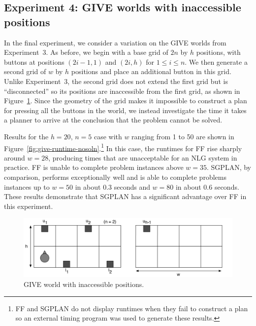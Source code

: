 \subsection{Experiment 4: GIVE worlds with inaccessible positions}
\label{sec:experiment-4:-give}

In the final experiment, we consider a variation on the GIVE worlds from
Experiment~3. As before, we begin with a base grid of $2n$ by $h$
positions, with buttons at positions $(2i-1,1)$ and $(2i,h)$ for $1 \leq i
\leq n$. We then generate a second grid of $w$ by $h$ positions and place
an additional button in this grid. Unlike Experiment~3, the second grid
does not extend the first grid but is ``disconnected'' so its positions are
inaccessible from the first grid, as shown in
Figure~\ref{fig:give-junk-nosoln}. Since the geometry of the grid makes it
impossible to construct a plan for pressing all the buttons in the world,
we instead investigate the time it takes a planner to arrive at the
conclusion that the problem cannot be solved.

Results for the $h=20$, $n=5$ case with $w$ ranging from 1 to 50 are shown
in Figure~\ref{fig:give-runtime-nosoln}.\footnote{FF and SGPLAN do
 not display runtimes when they fail to construct a plan so an external timing
 program was used to generate these results.}
In this case, the runtimes for FF rise sharply around $w=28$, producing
times that are unacceptable for an NLG system in practice. FF is unable
to complete problem instances above $w=35$. SGPLAN, by comparison, performs
exceptionally well and is able to complete problems instances up to $w=50$
in about 0.3 seconds and $w=80$ in about 0.6 seconds. These results
demonstrate that SGPLAN has a significant advantage over FF in this
experiment. 

\begin{figure}[t]
  \centering
  \includegraphics[width=0.85\columnwidth]{pic-empty-inaccessible}
  \caption{GIVE world with inaccessible positions.}
  \label{fig:give-junk-nosoln}
\end{figure}

